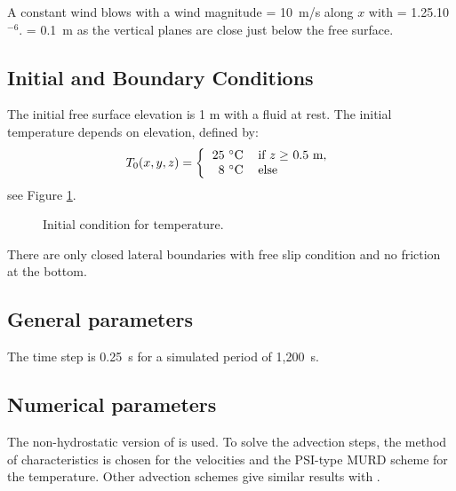 A constant wind blows with a wind magnitude = 10~m/s along $x$ with
 = 1.25.10$^{-6}$.
 = 0.1~m as the vertical planes
are close just below the free surface.
%
\subsection{Initial and Boundary Conditions}
%
%
The initial free surface elevation is 1 m with a fluid at rest.
The initial temperature depends on elevation, defined by:
\begin{equation}
  T_0(x,y,z) = \left\{
  \begin{tabular}{rl}
    25 $^{\circ}$C & if $z \geq$ 0.5~m,\\
    8  $^{\circ}$C & else
  \end{tabular}
  \right.
\end{equation}
see Figure \ref{fig:stratif_wind:temp_ic:section}.

\begin{figure}[H]
 \centering
  \caption{Initial condition for temperature.}\label{fig:stratif_wind:temp_ic:section}
\end{figure}

%
%
There are only closed lateral boundaries with free slip condition and no
friction at the bottom.
%
\subsection{General parameters}
%
The time step is 0.25~s for a simulated period of 1,200~s.
%
\subsection{Numerical parameters}
%
The non-hydrostatic version of  is used.
To solve the advection steps, the method of characteristics is chosen for the
velocities and the PSI-type MURD scheme for the temperature.
Other advection schemes give similar results with .
%
%
